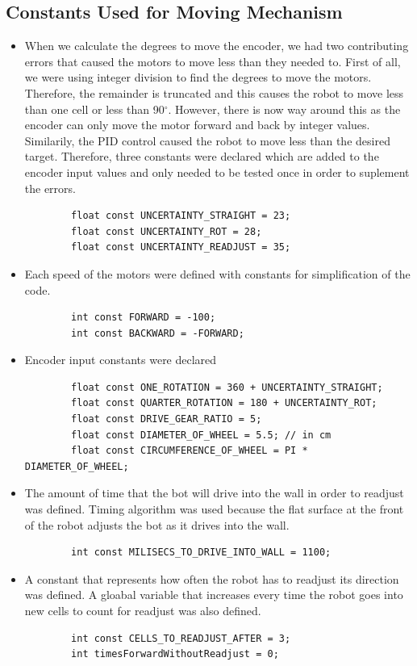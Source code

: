 \documentclass[11pt]{article}
\begin{document}

\subsection{Constants Used for Moving Mechanism}
\begin{itemize}
\item When we calculate the degrees to move the encoder, we had two contributing errors that caused the motors to move less than they needed to. First of all, we were using integer division to find the degrees to move the motors. Therefore, the remainder is truncated and this causes the robot to move less than one cell or less than 90$^{\circ}$. However, there is now way around this as the encoder can only move the motor forward and back by integer values. Similarily, the PID control caused the robot to move less than the desired target. Therefore, three constants were declared which are added to the encoder input values and only needed to be tested once in order to suplement the errors. 
	\begin{verbatim}
		float const UNCERTAINTY_STRAIGHT = 23;
		float const UNCERTAINTY_ROT = 28;
		float const UNCERTAINTY_READJUST = 35;
	\end{verbatim} 
\item Each speed of the motors were defined with constants for simplification of the code. 
	\begin{verbatim}
		int const FORWARD = -100;
		int const BACKWARD = -FORWARD;
	\end{verbatim} 
\item Encoder input constants were declared
	\begin{verbatim}
		float const ONE_ROTATION = 360 + UNCERTAINTY_STRAIGHT;
		float const QUARTER_ROTATION = 180 + UNCERTAINTY_ROT;
		float const DRIVE_GEAR_RATIO = 5;
		float const DIAMETER_OF_WHEEL = 5.5; // in cm
		float const CIRCUMFERENCE_OF_WHEEL = PI * DIAMETER_OF_WHEEL;
	\end{verbatim} 
\item The amount of time that the bot will drive into the wall in order to readjust was defined. Timing algorithm was used because the flat surface at the front of the robot adjusts the bot as it drives into the wall.
	\begin{verbatim}
		int const MILISECS_TO_DRIVE_INTO_WALL = 1100;
	\end{verbatim} 
\item A constant that represents how often the robot has to readjust its direction was defined. A gloabal variable that increases every time the robot goes into new cells to count for readjust was also defined.
	\begin{verbatim}
		int const CELLS_TO_READJUST_AFTER = 3;
		int timesForwardWithoutReadjust = 0;
	\end{verbatim}  
\end{itemize}
\newpage
\end{document}
